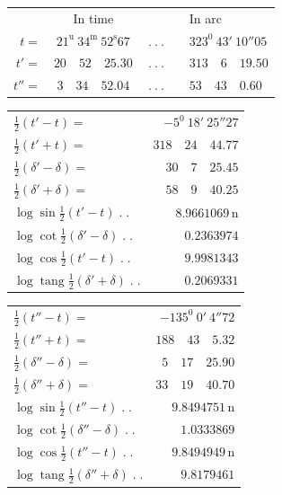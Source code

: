 \begin{center}\small
\begin{tabular}{rcrcl}
&In time&&&In arc\\
$t=$&$21^{\mathrm u}\ 34^{\mathrm m}\ 52^{\mathrm s}67$&$\ .\ .\ .$&&$323^0\ 43'\ 10''05$\\
$t'=$&$20\quad52\quad25.30$&$\ .\ .\ .$&&$313\quad6\quad19.50$\\
$t''=$&$3\quad34\quad52.04$&$\ .\ .\ .$&&$53\quad43\quad0.60$
\end{tabular}
\par\medskip
\begin{minipage}[t]{.49\textwidth}\centering
\begin{tabular}[t]{@{}lr@{}}
$\tfrac12(t'-t)=$&$-5^0\ 18'\ 25''27$\\
$\tfrac12(t'+t)=$&$318\quad24\quad44.77$\\[6pt]
$\tfrac12(\delta'-\delta)=$&$30\quad7\quad25.45$\\
$\tfrac12(\delta'+\delta)=$&$58\quad9\quad40.25$\\[6pt]
$\log\sin\tfrac12(t'-t)\;.\;.$&$8.9661069\,\mathrm n$\\
$\log\cot\tfrac12(\delta'-\delta)\;.\;.$&$0.2363974$\\[6pt]
$\log\cos\tfrac12(t'-t)\;.\;.$&$9.9981343$\\
$\log\operatorname{tang}\tfrac12(\delta'+\delta)\;.\;.$&$0.2069331$
\end{tabular}
\end{minipage}\hfill
\begin{minipage}[t]{.49\textwidth}\centering
\begin{tabular}[t]{@{}lr@{}}
$\tfrac12(t''-t)=$&$-135^0\ 0'\ 4''72$\\
$\tfrac12(t''+t)=$&$188\quad43\quad5.32$\\[6pt]
$\tfrac12(\delta''-\delta)=$&$5\quad17\quad25.90$\\
$\tfrac12(\delta''+\delta)=$&$33\quad19\quad40.70$\\[6pt]
$\log\sin\tfrac12(t''-t)\;.\;.$&$9.8494751\,\mathrm n$\\
$\log\cot\tfrac12(\delta''-\delta)\;.\;.$&$1.0333869$\\[6pt]
$\log\cos\tfrac12(t''-t)\;.\;.$&$9.8494949\,\mathrm n$\\
$\log\operatorname{tang}\tfrac12(\delta''+\delta)\;.\;.$&$9.8179461$
\end{tabular}
\end{minipage}
\end{center}
